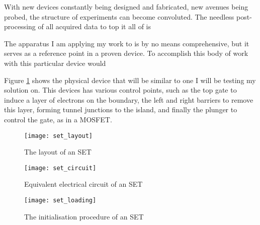 With new devices constantly being designed and fabricated, new avenues being probed, the structure of experiments can become convoluted. The needless post-processing of all acquired data to top it all of is 


The apparatus I am applying my work to is by no means comprehensive, but it serves as a reference point in a proven device. To accomplish this body of work with this particular device would 


Figure \ref{set_layout} shows the physical device that will be similar to one I will be testing my solution on. This devices has various control points, such as the top gate to induce a layer of electrons on the boundary, the left and right barriers to remove this layer, forming tunnel junctions to the island, and finally the plunger to control the gate, as in a MOSFET.

\begin{figure}[htbp!]
	\centering
	\texttt{[image: set\_layout]}
	\caption{The layout of an SET}
	\label{set_layout}
\end{figure}

\begin{figure}[htbp!]
	\centering
	\texttt{[image: set\_circuit]}
	\caption{Equivalent electrical circuit of an SET}
	\label{set_circuit}
\end{figure}

\begin{figure}[htbp!]
	\centering
	\texttt{[image: set\_loading]}
	\caption{The initialisation procedure of an SET}
	\label{set_loading}
\end{figure}
